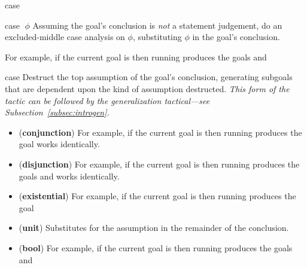 \begin{tactic}{case}
  \begin{tsyntax}{case $\;\phi$}
    Assuming the goal's conclusion is \emph{not} a statement
    judgement, do an excluded-middle case analysis on $\phi$,
    substituting $\phi$ in the goal's conclusion.

    For example, if the current goal is
     then
    running 
    produces the goals
    and
  \end{tsyntax}

  \begin{tsyntax}{case}
    Destruct the top assumption of the goal's conclusion, generating
    subgoals that are dependent upon the kind of assumption
    destructed. \emph{This form of the tactic can be followed by
    the generalization tactical---see Subsection~\ref{subsec:introgen}.}

    \begin{itemize}
    \item (\textbf{conjunction})
    For example, if the current goal is
     then
    running 
    produces the goal
    \ec{&&} works identically.

    \item (\textbf{disjunction})
    For example, if the current goal is
     then
    running 
    produces the goals
    and
    \ec{||} works identically.

    \item (\textbf{existential})
    For example, if the current goal is
     then
    running 
    produces the goal

    \item (\textbf{unit}) Substitutes  for the assumption in
      the remainder of the conclusion.

    \item (\textbf{bool})
    For example, if the current goal is
     then
    running 
    produces the goals
    and


\end{itemize}
\end{tsyntax}
\end{tactic}
